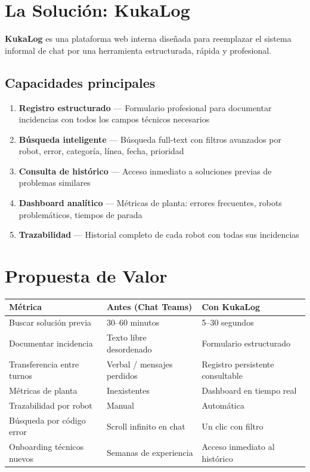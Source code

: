 \documentclass[11pt,a4paper]{article}
\begin{document}
\section{La Solución: KukaLog}

\textbf{KukaLog} es una plataforma web interna diseñada para reemplazar el sistema informal de chat por una herramienta estructurada, rápida y profesional.

\subsection{Capacidades principales}

\begin{enumerate}[noitemsep]
    \item \textbf{Registro estructurado} --- Formulario profesional para documentar incidencias con todos los campos técnicos necesarios
    \item \textbf{Búsqueda inteligente} --- Búsqueda full-text con filtros avanzados por robot, error, categoría, línea, fecha, prioridad
    \item \textbf{Consulta de histórico} --- Acceso inmediato a soluciones previas de problemas similares
    \item \textbf{Dashboard analítico} --- Métricas de planta: errores frecuentes, robots problemáticos, tiempos de parada
    \item \textbf{Trazabilidad} --- Historial completo de cada robot con todas sus incidencias
\end{enumerate}

\section{Propuesta de Valor}

\begin{center}
\begin{tabularx}{\textwidth}{lXX}
\toprule
\textbf{Métrica} & \textbf{Antes (Chat Teams)} & \textbf{Con KukaLog} \\
\midrule
Buscar solución previa & 30--60 minutos & 5--30 segundos \\
Documentar incidencia & Texto libre desordenado & Formulario estructurado \\
Transferencia entre turnos & Verbal / mensajes perdidos & Registro persistente consultable \\
Métricas de planta & Inexistentes & Dashboard en tiempo real \\
Trazabilidad por robot & Manual & Automática \\
Búsqueda por código error & Scroll infinito en chat & Un clic con filtro \\
Onboarding técnicos nuevos & Semanas de experiencia & Acceso inmediato al histórico \\
\bottomrule
\end{tabularx}
\end{center}
\end{document}
